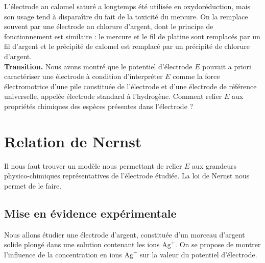 \documentclass[11pt,a4paper]{report}
\begin{document}
L'électrode au calomel saturé a longtemps été utilisée en oxydoréduction, mais son usage tend à disparaître du fait de la toxicité du mercure. On la remplace souvent par une électrode au chlorure d'argent, dont le principe de fonctionnement est similaire : le mercure et le fil de platine sont remplacés par un fil d'argent et le précipité de calomel est remplacé par un précipité de chlorure d'argent.\\

\textbf{Transition.} Nous avons montré que le potentiel d'électrode $E$ pouvait a priori caractériser une électrode à condition d'interpréter $E$ comme la force électromotrice d'une pile constituée de l'électrode et d'une électrode de référence universelle, appelée électrode standard à l'hydrogène. Comment relier $E$ aux propriétés chimiques des espèces présentes dans l'électrode ?

\newpage
\section{Relation de Nernst}

Il nous faut trouver un modèle nous permettant de relier $E$ aux grandeurs physico-chimiques représentatives de l'électrode étudiée. La loi de Nernst nous permet de le faire.

\subsection{Mise en évidence expérimentale}

Nous allons étudier une électrode d'argent, constituée d'un morceau d'argent solide plongé dans une solution contenant les ions $\text{Ag}^+$. On se propose de montrer l'influence de la concentration en ions $\text{Ag}^+$ sur la valeur du potentiel d'électrode.\\
\end{document}
